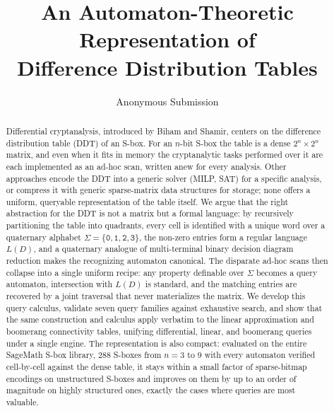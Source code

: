 \documentclass[runningheads]{llncs}
\begin{document}
\title{An Automaton-Theoretic Representation of\\ Difference Distribution Tables}
\author{Anonymous Submission}
\institute{}
\maketitle

\begin{abstract}
Differential cryptanalysis, introduced by Biham and Shamir, centers on the
difference distribution table (DDT) of an S-box. For an $n$-bit S-box the table
is a dense $2^{n}\times 2^{n}$ matrix, and even when it fits in memory the
cryptanalytic tasks performed over it are each implemented as an ad-hoc scan,
written anew for every analysis. Other approaches encode the DDT into a generic
solver (MILP, SAT) for a specific analysis, or compress it with generic
sparse-matrix data structures for storage; none offers a uniform, queryable
representation of the table itself. We argue that the right abstraction for the DDT is not a matrix but
a formal language: by recursively partitioning the table
into quadrants, every cell is identified with a unique word over a quaternary
alphabet $\Sigma = \{\texttt{0},\texttt{1},\texttt{2},\texttt{3}\}$, the non-zero entries form a
regular language $L(D)$, and a quaternary analogue of multi-terminal binary
decision diagram reduction makes the recognizing automaton canonical. The
disparate ad-hoc scans then collapse into a single uniform recipe: any property
definable over $\Sigma$ becomes a query automaton, intersection with $L(D)$ is
standard, and the matching entries are recovered by a joint traversal that
never materializes the matrix. We develop this query calculus, validate seven
query families against exhaustive search, and show that the same construction
and calculus apply verbatim to the linear approximation and boomerang
connectivity tables, unifying differential, linear, and boomerang queries under
a single engine. The representation is also compact: evaluated on the entire
SageMath S-box library, $288$ S-boxes from $n=3$ to $9$ with every automaton
verified cell-by-cell against the dense table, it stays within a small factor of
sparse-bitmap encodings on unstructured S-boxes and improves on them by up to
an order of magnitude on highly structured ones, exactly the cases where
queries are most valuable.
\end{abstract}
\end{document}
